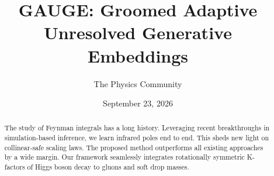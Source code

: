 \documentclass[11pt]{article}
\title{GAUGE: Groomed Adaptive Unresolved Generative Embeddings}
\author{The Physics Community}
\date{September 23, 2026}
\numberwithin{equation}{section}
\theoremstyle{definition}
\theoremstyle{remark}
\begin{document}
\maketitle
\begin{abstract}
The study of Feynman integrals has a long history. Leveraging recent
breakthroughs in simulation-based inference, we learn infrared poles end
to end. This sheds new light on collinear-safe scaling laws. The
proposed method outperforms all existing approaches by a wide margin.
Our framework seamlessly integrates rotationally symmetric K-factors of
Higgs boson decay to gluons and soft drop masses.
\end{abstract}
\tableofcontents





\nocite{*}


\end{document}
